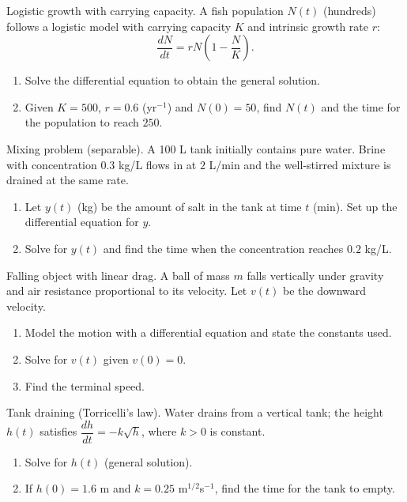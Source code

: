 \documentclass[11pt]{article}
\def\textbf#1{#1}%
\newcounter{question}
\begin{document}
\begin{question}
\textbf{Logistic growth with carrying capacity.}
A fish population $N(t)$ (hundreds) follows a logistic model with carrying capacity $K$ and intrinsic growth rate $r$: 
\[
\frac{dN}{dt}=rN\!\left(1-\frac{N}{K}\right).
\]
\begin{enumerate}
  \item Solve the differential equation to obtain the general solution.
  \item Given $K=500$, $r=0.6$ (yr$^{-1}$) and $N(0)=50$, find $N(t)$ and the time for the population to reach $250$.
\end{enumerate}
\end{question}

\begin{question}
\textbf{Mixing problem (separable).}
A 100 L tank initially contains pure water. Brine with concentration $0.3$ kg/L flows in at $2$ L/min and the well-stirred mixture is drained at the same rate.
\begin{enumerate}
  \item Let $y(t)$ (kg) be the amount of salt in the tank at time $t$ (min). Set up the differential equation for $y$.
  \item Solve for $y(t)$ and find the time when the concentration reaches $0.2$ kg/L.
\end{enumerate}
\end{question}

\begin{question}
\textbf{Falling object with linear drag.}
A ball of mass $m$ falls vertically under gravity and air resistance proportional to its velocity. Let $v(t)$ be the downward velocity.
\begin{enumerate}
  \item Model the motion with a differential equation and state the constants used.
  \item Solve for $v(t)$ given $v(0)=0$.
  \item Find the terminal speed.
\end{enumerate}
\end{question}

\begin{question}
\textbf{Tank draining (Torricelli’s law).}
Water drains from a vertical tank; the height $h(t)$ satisfies $\dfrac{dh}{dt}=-k\sqrt{h}$, where $k>0$ is constant.
\begin{enumerate}
  \item Solve for $h(t)$ (general solution).
  \item If $h(0)=1.6$ m and $k=0.25$ m$^{1/2}$s$^{-1}$, find the time for the tank to empty.
\end{enumerate}
\end{question}
\end{document}
